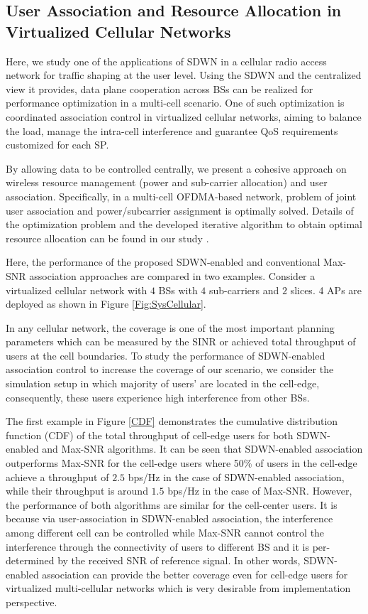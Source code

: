 \documentclass[conference]{IEEEtran}
\begin{document}
\subsection{User Association and Resource Allocation in Virtualized Cellular Networks}
Here, we study one of the applications of SDWN in a cellular radio access network for traffic shaping at the user level. Using the SDWN and the centralized view it provides, data plane cooperation across BSs can be realized for performance optimization in a multi-cell scenario. One of such optimization is coordinated association control in virtualized cellular networks, aiming to balance the load, manage the intra-cell interference and guarantee QoS requirements customized for each SP. 

By allowing data to be controlled centrally, we present a cohesive approach on wireless resource management (power and sub-carrier allocation) and user association. Specifically, in a multi-cell OFDMA-based network, problem of joint user association and power/subcarrier assignment is optimally solved. Details of the optimization problem and the developed iterative algorithm to obtain optimal resource allocation can be found in our study \cite{Parsaeefard2015}.


Here, the performance of the proposed SDWN-enabled and conventional Max-SNR association approaches are compared in two examples. Consider a virtualized cellular network with $4$ BSs with $4$ sub-carriers and $2$ slices. 4 APs are deployed as shown in Figure \ref{Fig:SysCellular}. 

In any cellular network, the coverage is one of the most important planning parameters which can be measured by the SINR or achieved total throughput of users at the cell boundaries. To study the performance of SDWN-enabled association control to increase the coverage of our scenario, we consider the simulation setup in which majority of users’ are located in the cell-edge, consequently, these users experience high interference from other BSs.

The first example in Figure \ref{CDF} demonstrates the cumulative distribution function (CDF) of the total throughput of cell-edge users for both SDWN-enabled and Max-SNR algorithms. It can be seen that SDWN-enabled association outperforms Max-SNR for the cell-edge users where 50\% of users in the cell-edge achieve a throughput of $2.5$ bps/Hz in the case of SDWN-enabled association, while their throughput is around $1.5$ bps/Hz in the case of Max-SNR. However, the performance of both algorithms are similar for the cell-center users. It is because via user-association in SDWN-enabled association, the interference among different cell can be controlled while Max-SNR cannot control the interference through the connectivity of users to different BS and it is per-determined by the received SNR of reference signal. In other words, SDWN-enabled association can provide the better coverage even for cell-edge users for virtualized multi-cellular networks which is very desirable from implementation perspective.
\end{document}
